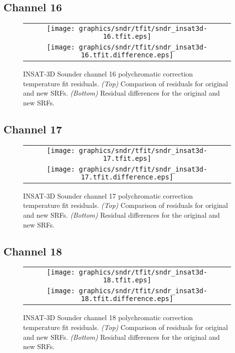 \subsection{Channel 16}
\begin{figure}[H]
  \label{fig:sndr_ch16_tfit}
  \centering
  \begin{tabular}{c}
    \texttt{[image: graphics/sndr/tfit/sndr\_insat3d-16.tfit.eps]} \\
    \texttt{[image: graphics/sndr/tfit/sndr\_insat3d-16.tfit.difference.eps]}
  \end{tabular}
  \caption{INSAT-3D Sounder channel 16 polychromatic correction temperature fit residuals. \emph{(Top)} Comparison of residuals for original and new SRFs. \emph{(Bottom)} Residual differences for the original and new SRFs.}
\end{figure}

\subsection{Channel 17}
\begin{figure}[H]
  \label{fig:sndr_ch17_tfit}
  \centering
  \begin{tabular}{c}
    \texttt{[image: graphics/sndr/tfit/sndr\_insat3d-17.tfit.eps]} \\
    \texttt{[image: graphics/sndr/tfit/sndr\_insat3d-17.tfit.difference.eps]}
  \end{tabular}
  \caption{INSAT-3D Sounder channel 17 polychromatic correction temperature fit residuals. \emph{(Top)} Comparison of residuals for original and new SRFs. \emph{(Bottom)} Residual differences for the original and new SRFs.}
\end{figure}

\subsection{Channel 18}
\begin{figure}[H]
  \label{fig:sndr_ch18_tfit}
  \centering
  \begin{tabular}{c}
    \texttt{[image: graphics/sndr/tfit/sndr\_insat3d-18.tfit.eps]} \\
    \texttt{[image: graphics/sndr/tfit/sndr\_insat3d-18.tfit.difference.eps]}
  \end{tabular}
  \caption{INSAT-3D Sounder channel 18 polychromatic correction temperature fit residuals. \emph{(Top)} Comparison of residuals for original and new SRFs. \emph{(Bottom)} Residual differences for the original and new SRFs.}
\end{figure}
